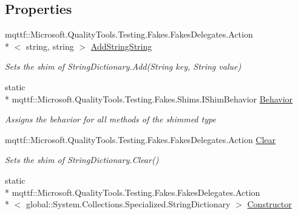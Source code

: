 \subsection*{Properties}
\begin{DoxyCompactItemize}
\item 
mqttf\-::\-Microsoft.\-Quality\-Tools.\-Testing.\-Fakes.\-Fakes\-Delegates.\-Action\\*
$<$ string, string $>$ \hyperlink{class_system_1_1_collections_1_1_specialized_1_1_fakes_1_1_shim_string_dictionary_aeca7c8a6048f64328e6132532432dadd}{Add\-String\-String}
\begin{DoxyCompactList}\small\item\em Sets the shim of String\-Dictionary.\-Add(\-String key, String value)\end{DoxyCompactList}\item 
static \\*
mqttf\-::\-Microsoft.\-Quality\-Tools.\-Testing.\-Fakes.\-Shims.\-I\-Shim\-Behavior \hyperlink{class_system_1_1_collections_1_1_specialized_1_1_fakes_1_1_shim_string_dictionary_a56851fce06fc98df52b4b250d3642dd6}{Behavior}
\begin{DoxyCompactList}\small\item\em Assigns the behavior for all methods of the shimmed type\end{DoxyCompactList}\item 
mqttf\-::\-Microsoft.\-Quality\-Tools.\-Testing.\-Fakes.\-Fakes\-Delegates.\-Action \hyperlink{class_system_1_1_collections_1_1_specialized_1_1_fakes_1_1_shim_string_dictionary_a349e780a50ac03c08a462988bb87b57b}{Clear}
\begin{DoxyCompactList}\small\item\em Sets the shim of String\-Dictionary.\-Clear()\end{DoxyCompactList}\item 
static \\*
mqttf\-::\-Microsoft.\-Quality\-Tools.\-Testing.\-Fakes.\-Fakes\-Delegates.\-Action\\*
$<$ global\-::\-System.\-Collections.\-Specialized.\-String\-Dictionary $>$ \hyperlink{class_system_1_1_collections_1_1_specialized_1_1_fakes_1_1_shim_string_dictionary_a9a016ab9f496d194642e6d54dc61fc1c}{Constructor}

\end{DoxyCompactItemize}
